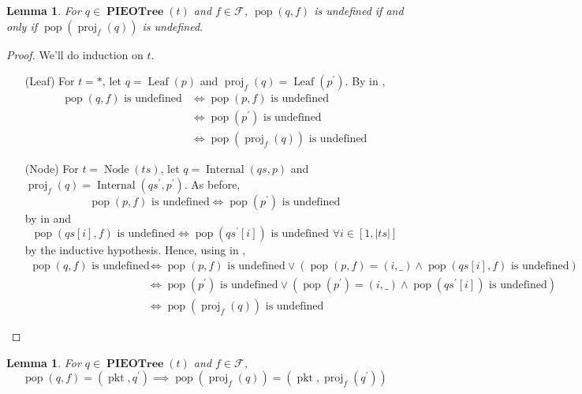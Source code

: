 \documentclass{amsart}
\DeclareMathOperator{\pkt}{\mathrm{pkt}}
\DeclareMathOperator{\pop}{\mathrm{pop}}
\DeclareMathOperator{\proj}{\mathrm{proj}}
\DeclareMathOperator{\PIEOTree}{\mathbf{PIEOTree}}
\DeclareMathOperator{\Leaf}{\mathrm{Leaf}}
\DeclareMathOperator{\Internal}{\mathrm{Internal}}
\DeclareMathOperator{\Node}{\mathrm{Node}}
\newtheorem{lem}[thm]{Lemma}
\theoremstyle{definition}
\begin{document}
\begin{lem}
    \label{lem:pop_undef}
    For $q \in \PIEOTree(t)$ and $f \in \mathcal F$, $\pop(q, f)$ is undefined if and only if $\pop(\proj_f(q))$ is undefined.
\end{lem}

\begin{proof}
    We'll do induction on $t$.
    \begin{itemize}
        \item[(Leaf)] For $t = \ast$, let $q = \Leaf(p)$ and $\proj_f(q) = \Leaf(p^\prime)$.
            By  in ,
            \begin{align*}
                \pop(q, f) \text{ is undefined} &\iff \pop(p, f) \text{ is undefined} \\
                                                &\iff \pop(p^\prime) \text{ is undefined} \\
                                                &\iff \pop(\proj_f(q)) \text{ is undefined}
            \end{align*}

        \item[(Node)] For $t = \Node(ts)$, let $q = \Internal(qs, p)$ and $\proj_f(q) = \Internal(qs^\prime, p^\prime)$.
            As before, 
            $$\pop(p, f) \text{ is undefined} \iff \pop(p^\prime) \text{ is undefined}$$
            by  in  and 
            $$\pop(qs[i], f) \text{ is undefined} \iff \pop(qs^\prime[i]) \text{ is undefined $\forall i \in [1, |ts|]$}$$
            by the inductive hypothesis.
            Hence, using  in , 
            \begin{align*}
                \pop(q, f) \text{ is undefined} &\iff \pop(p, f) \text{ is undefined} \lor (\pop(p, f) = (i, \_) \land \pop(qs[i], f) \text{ is undefined})\\
                                                &\iff \pop(p^\prime) \text{ is undefined} \lor (\pop(p^{\prime}) = (i, \_) \land \pop(qs^{\prime}[i]) \text{ is undefined})\\
                                                &\iff \pop(\proj_f(q)) \text{ is undefined}
            \end{align*}
    \end{itemize}
\end{proof}

\begin{lem}
    \label{lem:pop}
    For $q \in \PIEOTree(t)$ and $f \in \mathcal F$, 
    $$
        \pop(q, f) = (\pkt, q^\prime) \implies \pop(\proj_f(q)) = (\pkt, \proj_f(q^\prime))
    $$
\end{lem}
\end{document}
